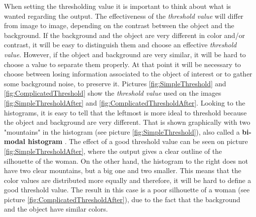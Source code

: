 When setting the thresholding value it is important to think about what is wanted regarding the output. The effectiveness of the \textit{threshold value} will differ from image to image, depending on the contrast between the object and the background. If the background and the object are very different in color and/or contrast, it will be easy to distinguish them and choose an effective \textit{threshold value}. However, if the object and background are very similar, it will be hard to choose a value to separate them properly. At that point it will be necessary to choose between losing information associated to the object of interest or to gather some background noise, to preserve it. Pictures \ref{fig:SimpleThreshold} and \ref{fig:ComplicatedThreshold} show the \textit{threshold value} used on the images \ref{fig:SimpleThresholdAfter} and \ref{fig:ComplicatedThresholdAfter}. Looking to the histograms, it is easy to tell that the leftmost is more ideal to threshold because the object and background are very different. That is shown graphically with two "mountains" in the histogram (see picture \ref{fig:SimpleThreshold}), also called a \textbf{bi-modal histogram} \citep{ip_book}. The effect of a good threshold value can be seen on picture \ref{fig:SimpleThresholdAfter}, where the output gives a clear outline of the silhouette of the woman. On the other hand, the histogram to the right does not have two clear mountains, but a big one and two smaller. This means that the color values are distributed more equally and therefore, it will be hard to define a good threshold value. The result in this case is a poor silhouette of a woman (see picture \ref{fig:ComplicatedThresholdAfter}), due to the fact that the background and the object have similar colors.


